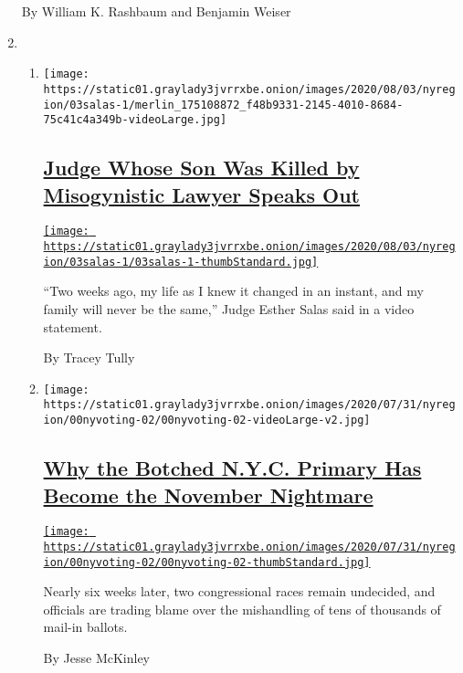 \begin{enumerate}
  By William K. Rashbaum and Benjamin Weiser
\item
  \begin{enumerate}
  \def\labelenumii{\arabic{enumii}.}
  \item
    \texttt{[image: https://static01.graylady3jvrrxbe.onion/images/2020/08/03/nyregion/03salas-1/merlin\_175108872\_f48b9331-2145-4010-8684-75c41c4a349b-videoLarge.jpg]}

    \hypertarget{judge-whose-son-was-killed-by-misogynistic-lawyer-speaks-out}{%
    \subsection{\texorpdfstring{\href{/2020/08/03/nyregion/esther-salas-roy-den-hollander.html}{Judge
    Whose Son Was Killed by Misogynistic Lawyer Speaks
    Out}}{Judge Whose Son Was Killed by Misogynistic Lawyer Speaks Out}}\label{judge-whose-son-was-killed-by-misogynistic-lawyer-speaks-out}}

    \href{/2020/08/03/nyregion/esther-salas-roy-den-hollander.html}{\texttt{[image: https://static01.graylady3jvrrxbe.onion/images/2020/08/03/nyregion/03salas-1/03salas-1-thumbStandard.jpg]}}

    ``Two weeks ago, my life as I knew it changed in an instant, and my
    family will never be the same,'' Judge Esther Salas said in a video
    statement.

    By Tracey Tully
  \item
    \texttt{[image: https://static01.graylady3jvrrxbe.onion/images/2020/07/31/nyregion/00nyvoting-02/00nyvoting-02-videoLarge-v2.jpg]}

    \hypertarget{why-the-botched-nyc-primary-has-become-the-november-nightmare}{%
    \subsection{\texorpdfstring{\href{/2020/08/03/nyregion/nyc-mail-ballots-voting.html}{Why
    the Botched N.Y.C. Primary Has Become the November
    Nightmare}}{Why the Botched N.Y.C. Primary Has Become the November Nightmare}}\label{why-the-botched-nyc-primary-has-become-the-november-nightmare}}

    \href{/2020/08/03/nyregion/nyc-mail-ballots-voting.html}{\texttt{[image: https://static01.graylady3jvrrxbe.onion/images/2020/07/31/nyregion/00nyvoting-02/00nyvoting-02-thumbStandard.jpg]}}

    Nearly six weeks later, two congressional races remain undecided,
    and officials are trading blame over the mishandling of tens of
    thousands of mail-in ballots.

    By Jesse McKinley
  \end{enumerate}
\end{enumerate}

